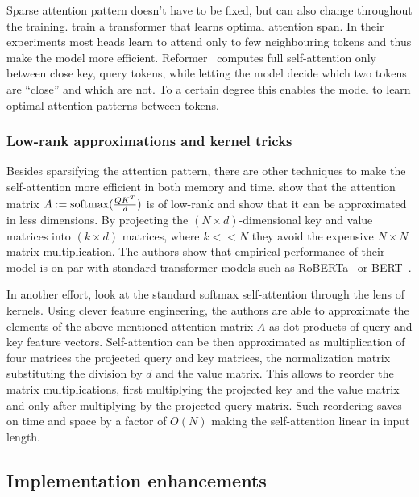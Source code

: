 Sparse attention pattern doesn't have to be fixed, but can also change
throughout the training. \cite{sukhbaatar2019adaptive} train a transformer that
learns optimal attention span. In their experiments most heads learn to attend
only to few neighbouring tokens and thus make the model more efficient.
Reformer~\cite{kitaev2020reformer} computes full self-attention only between
close key, query tokens, while letting the model decide which two tokens are
``close'' and which are not. To a certain degree this enables the model to learn
optimal attention patterns between tokens.

\subsubsection{Low-rank approximations and kernel tricks}

Besides sparsifying the attention pattern, there are other techniques to make
the self-attention more efficient in both memory and time.
\cite{wang2020linformer} show that the attention matrix $A :=
\operatorname*{\textrm{softmax}}(\frac{QK^T}{d})$ is of low-rank and show that it can be approximated
in less dimensions. By projecting the $(N \times d)$-dimensional key and value
matrices into $(k \times d)$ matrices, where $k << N$ they avoid the expensive
$N\times N$ matrix multiplication. The authors show that empirical performance
of their model is on par with standard transformer models such as
RoBERTa~\cite{liu2019roberta} or BERT~\cite{devlin2019bert}.

In another effort, \cite{choromanski2020rethinking} look at the standard
softmax self-attention through the lens of kernels. Using clever feature
engineering, the authors are able to approximate the elements of the above
mentioned attention matrix $A$ as dot products of query and key feature
vectors. Self-attention can be then approximated as multiplication of four
matrices the projected query and key matrices, the normalization matrix
substituting the division by $d$ and the value matrix. This allows to reorder
the matrix multiplications, first multiplying the projected key and the value
matrix and only after multiplying by the projected query matrix. Such
reordering saves on time and space by a factor of $O(N)$ making the
self-attention linear in input length.

\subsection{Implementation enhancements}


